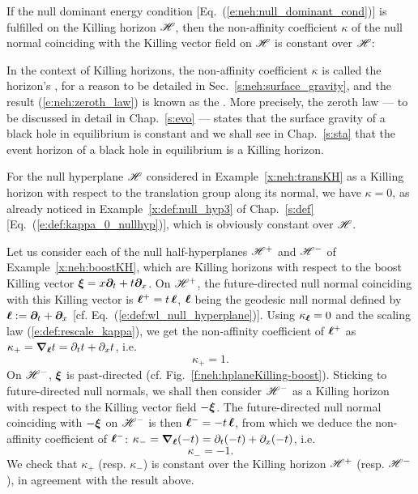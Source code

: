 \begin{prop}
\label{p:neh:zeroth_law}
If the null dominant energy condition
[Eq.~(\ref{e:neh:null_dominant_cond})]
is fulfilled on the Killing horizon $\mathscr{H}$, then the non-affinity coefficient $\kappa$
of the null normal coinciding with the Killing vector field on
$\mathscr{H}$ is constant over $\mathscr{H}$:
\be \label{e:neh:zeroth_law}
\ee
\end{prop}
In the context of Killing horizons, the non-affinity coefficient $\kappa$ is
called the horizon's ,
for a reason to be detailed in Sec.~\ref{s:neh:surface_gravity},
and the result
(\ref{e:neh:zeroth_law}) is known as the
. More precisely,
the zeroth law --- to be discussed in detail in Chap.~\ref{s:evo} ---
states that the surface gravity of a black hole in equilibrium is
constant and we shall see in Chap.~\ref{s:sta} that the event horizon of a black hole in
equilibrium is a Killing horizon.

\begin{example}
\label{x:neh:transKH_kappa}
For the null hyperplane $\mathscr{H}$ considered in Example~\ref{x:neh:transKH} as a Killing horizon with respect to the translation group along its normal, we have
$\kappa = 0$, as already noticed in Example~\ref{x:def:null_hyp3} of Chap.~\ref{s:def}
[Eq.~(\ref{e:def:kappa_0_nullhyp})], which is obviously constant over $\mathscr{H}$.
\end{example}

\begin{example}
\label{x:neh:boostKH_kappa}
Let us consider each of the null half-hyperplanes $\mathscr{H}^+$
and $\mathscr{H}^-$ of Example~\ref{x:neh:boostKH}, which are Killing horizons with
respect to the boost Killing vector $\bm{\xi} = x \bm{\partial}_t + t \bm{\partial}_x$. On
$\mathscr{H}^+$, the future-directed null normal coinciding with this Killing vector
is $\bm{\ell}^+ = t\,  \bm{\ell}$, $\bm{\ell}$ being the geodesic null normal defined by
$\bm{\ell}:= \bm{\partial}_t + \bm{\partial}_x$ [cf. Eq.~(\ref{e:def:wl_null_hyperplane})].
Using $\kappa_{\bm{\ell}} = 0$ and the scaling law (\ref{e:def:rescale_kappa}),
we get the non-affinity
coefficient of $\bm{\ell}^+$ as $\kappa_+= \bm{\nabla}_{\bm{\ell}} t = \partial_t t + \partial_x t$, i.e.
\[
    \kappa_+ = 1 .
\]
On $\mathscr{H}^-$, $\bm{\xi}$ is past-directed (cf. Fig.~\ref{f:neh:hplaneKilling-boost}).
Sticking to future-directed null normals, we shall then consider $\mathscr{H}^-$
as a Killing horizon with respect to the Killing vector field $-\bm{\xi}$.
The future-directed null normal coinciding with $-\bm{\xi}$ on $\mathscr{H}^-$ is then
$\bm{\ell}^- = -t\,  \bm{\ell}$, from which we deduce the non-affinity
coefficient of $\bm{\ell}^-$: $\kappa_-= \bm{\nabla}_{\bm{\ell}} (-t) = \partial_t (-t) + \partial_x (-t)$, i.e.
\[
    \kappa_- = -1 .
\]
We check that $\kappa_+$ (resp.  $\kappa_-$) is constant over the Killing horizon $\mathscr{H}^+$ (resp. $\mathscr{H}^-$), in agreement with the result above.
\end{example}

